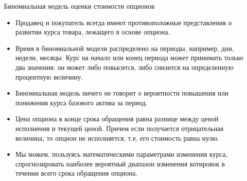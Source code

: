 \documentclass[financial_risks_lectures.tex]{subfiles}
\begin{document}
\begin{frame}{Биномиальная модель оценки стоимости опционов}
\begin{itemize}[<+->]
\item
Продавец и покупатель всегда имеют противоположные представления о развитии курса товара, лежащего в основе опциона. 
\item
Время в биномиальной модели распределено на периоды, например, дни, недели, месяцы. Курс на начало или конец периода может принимать только два значения: он может либо повысится, либо снизится на определенную процентную величину. 
\item
Биномиальная модель ничего не говорит о вероятности повышения или понижения курса базового актива за период.
\end{itemize}
\end{frame}
\begin{frame}{}
\begin{itemize}[<+->]
\item
Цена опциона в конце срока обращения равна разнице между ценой исполнения и текущей ценой. Причем если получается отрицательная величина, то опцион не исполняется, т.е. его стоимость равна нулю. 
\item
Мы можем, пользуясь математическими параметрами изменения курса, спрогнозировать наиболее вероятный диапазон изменения котировок в течении всего срока обращения опциона. 
\end{itemize}
\end{frame}
\end{document}
